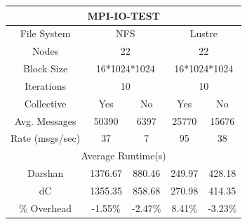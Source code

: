 \begin{table}[h]
    \begin{subtable}[h]{0.5\textwidth}
    \vspace{0.5cm}
        \centering
        \setlength\tabcolsep{8pt}
       \begin{tabular}{|ccccc|}
        \hline
        \multicolumn{5}{|c|}{MPI-IO-TEST}                                                                                                           \\ \hline
        \multicolumn{1}{|c|}{File System}     & \multicolumn{2}{c|}{NFS}                                    & \multicolumn{2}{c|}{Lustre}           \\ \hline
        \multicolumn{1}{|c|}{Nodes}           & \multicolumn{2}{c|}{22}                                     & \multicolumn{2}{c|}{22}               \\ \hline
        \multicolumn{1}{|c|}{Block Size}      & \multicolumn{2}{c|}{16*1024*1024}                           & \multicolumn{2}{c|}{16*1024*1024}     \\ \hline
        \multicolumn{1}{|c|}{Iterations}      & \multicolumn{2}{c|}{10}                                     & \multicolumn{2}{c|}{10}               \\ \hline
        \multicolumn{1}{|c|}{Collective}      & \multicolumn{1}{c|}{Yes}     & \multicolumn{1}{c|}{No}      & \multicolumn{1}{c|}{Yes}    & No      \\ \hline
        \multicolumn{1}{|c|}{Avg. Messages}   & \multicolumn{1}{c|}{50390}   & \multicolumn{1}{c|}{6397}    & \multicolumn{1}{c|}{25770}  & 15676   \\ \hline
        \multicolumn{1}{|c|}{Rate (msgs/sec)} & \multicolumn{1}{c|}{37}      & \multicolumn{1}{c|}{7}       & \multicolumn{1}{c|}{95}     & 38      \\ \hline
        \multicolumn{5}{|c|}{Average Runtime(s)}                                                                                                    \\ \hline
        \multicolumn{1}{|c|}{Darshan}         & \multicolumn{1}{c|}{1376.67} & \multicolumn{1}{c|}{880.46}  & \multicolumn{1}{c|}{249.97} & 428.18  \\ \hline
        \multicolumn{1}{|c|}{dC}              & \multicolumn{1}{c|}{1355.35} & \multicolumn{1}{c|}{858.68}  & \multicolumn{1}{c|}{270.98} & 414.35  \\ \hline
        \multicolumn{1}{|c|}{\% Overhead}     & \multicolumn{1}{c|}{-1.55\%} & \multicolumn{1}{c|}{-2.47\%} & \multicolumn{1}{c|}{8.41\%} & -3.23\% \\ \hline

\end{tabular}
\end{subtable}
\end{table}
